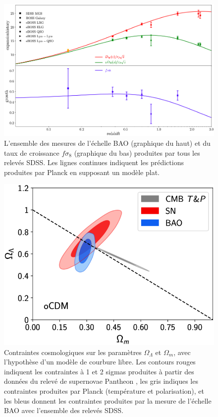\begin{figure}
  \centering
  \includegraphics[scale=0.42]{exp_history}
  \caption{L'ensemble des mesures de l'échelle BAO (graphique du haut) et du taux de croissance $f \sigma_8$ (graphique du bas) produites par tous les relevés SDSS. Les lignes continues indiquent les prédictions produites par Planck en supposant un modèle \lcdm{} plat.}
  \label{fig:exp_hist}
\end{figure}

\begin{figure}
  \centering
  \includegraphics[scale=0.45]{olambda_om}
  \caption{Contraintes cosmologiques sur les paramètres $\Omega_{\Lambda}$ et $\Omega_{m}$, avec l'hypothèse d'un modèle \lcdm{} de courbure libre. Les contours rouges indiquent les contraintes à 1 et 2 sigmas produites à partir des données du relevé de supernovae Pantheon \autocite{Scolnic2017}, les gris indiques les contraintes produites par Planck (température et polarisation), et les bleus donnent les contraintes produites par la mesure de l'échelle BAO avec l'ensemble des relevés SDSS.}
  \label{fig:olambda_om}
\end{figure}


